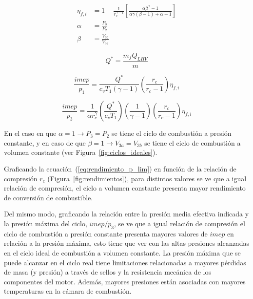 
\begin{align}
    \label{eq:rendimiento_p_lim}
  \eta_{f,i} &= 1 - \frac{1}{r_c^{\gamma - 1}} \left[ \frac{\alpha \beta^\gamma-1}{\alpha \gamma (\beta-1)+\alpha-1} \right]\\
  \alpha &= \frac{P_3}{P_2}\\ \beta &= \frac{V_{3b}}{V_{3a}}
\end{align}


\begin{equation}
    \label{eq:Q*} Q^{*}=  \frac{m_{f}Q_{LHV}}{m}
\end{equation}



\begin{equation}
    \label{eq:imep_p1} \frac{imep}{p_1} = \frac{Q^*}{c_v T_1 (\gamma-1)} \left( \frac{r_c}{r_c-1} \right) \eta_{f,i}
\end{equation}

\begin{equation}
    \label{eq:imep_p3} \frac{imep}{p_3} = \frac{1}{\alpha r_c^\gamma} \left( \frac{Q^*}{c_v T_1} \right) \left(\frac{1}{\gamma-1} \right) \left( \frac{r_c}{r_c-1} \right) \eta_{f,i}
\end{equation}

En el caso en que  $\alpha=1 \rightarrow P_3=P_2$ se tiene el ciclo de
combustión a presión constante, y en caso de que
$\beta=1 \rightarrow V_{3a}=V_{3b}$ se tiene el ciclo de combustión a volumen
constante (ver Figura~\ref{fig:ciclos_ideales}).

Graficando la ecuación~(\ref{eq:rendimiento_p_lim}) en función de la relación de
compresión $r_c$ (Figura~\ref{fig:rendimientos}), para distintos valores se ve
que a igual relación de compresión, el ciclo a volumen constante presenta mayor
rendimiento de conversión de combustible.

Del mismo modo, graficando la relación entre la presión media efectiva indicada
y la presión máxima del ciclo, $imep/p_3$, se ve que a igual relación de
compresión el ciclo de combustión a presión constante presenta mayores valores
de $imep$ en relación a la presión máxima, esto tiene que ver con las altas
presiones alcanzadas en el ciclo ideal de combustión a volumen constante.
%
La presión máxima que se puede alcanzar en el ciclo real tiene limitaciones
relacionadas a mayores pérdidas de masa (y presión) a través de sellos y la
resistencia mecánica de los componentes del motor.
%
Además, mayores presiones están asociadas con mayores temperaturas en la cámara
de combustión.

